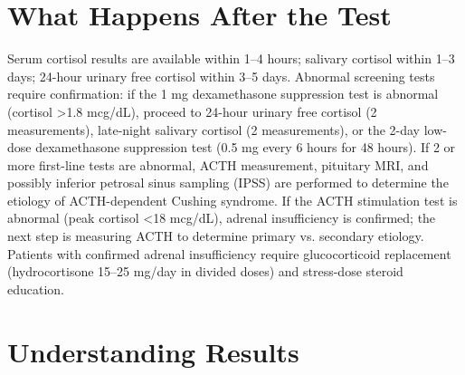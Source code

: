 \section*{What Happens After the Test}
Serum cortisol results are available within 1--4 hours; salivary cortisol within 1--3 days; 24-hour urinary free cortisol within 3--5 days. Abnormal screening tests require confirmation: if the 1 mg dexamethasone suppression test is abnormal (cortisol >1.8 mcg/dL), proceed to 24-hour urinary free cortisol (2 measurements), late-night salivary cortisol (2 measurements), or the 2-day low-dose dexamethasone suppression test (0.5 mg every 6 hours for 48 hours). If 2 or more first-line tests are abnormal, ACTH measurement, pituitary MRI, and possibly inferior petrosal sinus sampling (IPSS) are performed to determine the etiology of ACTH-dependent Cushing syndrome. If the ACTH stimulation test is abnormal (peak cortisol <18 mcg/dL), adrenal insufficiency is confirmed; the next step is measuring ACTH to determine primary vs. secondary etiology. Patients with confirmed adrenal insufficiency require glucocorticoid replacement (hydrocortisone 15--25 mg/day in divided doses) and stress-dose steroid education.

\section*{Understanding Results}

